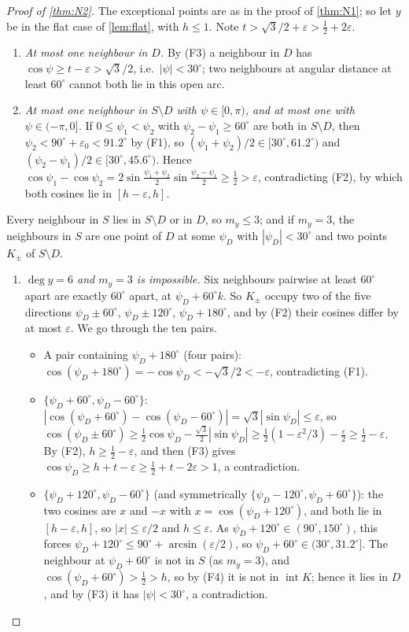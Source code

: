 \documentclass[11pt]{amsart}
\theoremstyle{definition}
\theoremstyle{remark}
\newcommand{\eps}{\varepsilon}
\begin{document}
\begin{proof}[Proof of \cref{thm:N2}]
The exceptional points are as in the proof of \cref{thm:N1}; so let $y$ be in the flat case of \cref{lem:flat}, with $h\le1$. Note $t>\sqrt3/2+\eps>\frac12+2\eps$.
\begin{enumerate}[label=(\roman*),leftmargin=2em]
\item \emph{At most one neighbour in $D$.} By (F3) a neighbour in $D$ has $\cos\psi\ge t-\eps>\sqrt3/2$, i.e.\ $|\psi|<30^\circ$; two neighbours at angular distance at least $60^\circ$ cannot both lie in this open arc.
\item \emph{At most one neighbour in $S\setminus D$ with $\psi\in[0,\pi)$, and at most one with $\psi\in(-\pi,0]$.} If $0\le\psi_1<\psi_2$ with $\psi_2-\psi_1\ge60^\circ$ are both in $S\setminus D$, then $\psi_2<90^\circ+\eps_0<91.2^\circ$ by (F1), so $(\psi_1+\psi_2)/2\in[30^\circ,61.2^\circ)$ and $(\psi_2-\psi_1)/2\in[30^\circ,45.6^\circ)$. Hence $\cos\psi_1-\cos\psi_2=2\sin\frac{\psi_1+\psi_2}2\sin\frac{\psi_2-\psi_1}2\ge\frac12>\eps$, contradicting (F2), by which both cosines lie in $[h-\eps,h]$.
\end{enumerate}
Every neighbour in $S$ lies in $S\setminus D$ or in $D$, so $m_y\le3$; and if $m_y=3$, the neighbours in $S$ are one point of $D$ at some $\psi_D$ with $|\psi_D|<30^\circ$ and two points $K_\pm$ of $S\setminus D$.
\begin{enumerate}[label=(\roman*),leftmargin=2em,resume]
\item \emph{$\deg y=6$ and $m_y=3$ is impossible.} Six neighbours pairwise at least $60^\circ$ apart are exactly $60^\circ$ apart, at $\psi_D+60^\circ k$. So $K_\pm$ occupy two of the five directions $\psi_D\pm60^\circ$, $\psi_D\pm120^\circ$, $\psi_D+180^\circ$, and by (F2) their cosines differ by at most $\eps$. We go through the ten pairs.
\begin{itemize}[leftmargin=1.5em]
\item A pair containing $\psi_D+180^\circ$ (four pairs): $\cos(\psi_D+180^\circ)=-\cos\psi_D<-\sqrt3/2<-\eps$, contradicting (F1).
\item $\{\psi_D+60^\circ,\psi_D-60^\circ\}$: $|\cos(\psi_D+60^\circ)-\cos(\psi_D-60^\circ)|=\sqrt3|\sin\psi_D|\le\eps$, so $\cos(\psi_D\pm60^\circ)\ge\frac12\cos\psi_D-\frac{\sqrt3}2|\sin\psi_D|\ge\frac12(1-\eps^2/3)-\frac\eps2\ge\frac12-\eps$. By (F2), $h\ge\frac12-\eps$, and then (F3) gives $\cos\psi_D\ge h+t-\eps\ge\frac12+t-2\eps>1$, a contradiction.
\item $\{\psi_D+120^\circ,\psi_D-60^\circ\}$ (and symmetrically $\{\psi_D-120^\circ,\psi_D+60^\circ\}$): the two cosines are $x$ and $-x$ with $x=\cos(\psi_D+120^\circ)$, and both lie in $[h-\eps,h]$, so $|x|\le\eps/2$ and $h\le\eps$. As $\psi_D+120^\circ\in(90^\circ,150^\circ)$, this forces $\psi_D+120^\circ\le90^\circ+\arcsin(\eps/2)$, so $\psi_D+60^\circ\in(30^\circ,31.2^\circ]$. The neighbour at $\psi_D+60^\circ$ is not in $S$ (as $m_y=3$), and $\cos(\psi_D+60^\circ)>\frac12>h$, so by (F4) it is not in $\operatorname{int}K$; hence it lies in $D$, and by (F3) it has $|\psi|<30^\circ$, a contradiction.

\end{itemize}
\end{enumerate}
\end{proof}
\end{document}
